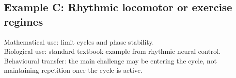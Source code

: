 \subsection*{Example C: Rhythmic locomotor or exercise regimes}

Mathematical use: limit cycles and phase stability.\\
Biological use: standard textbook example from rhythmic neural control.\\
Behavioural transfer: the main challenge may be entering the cycle, not
maintaining repetition once the cycle is active.
